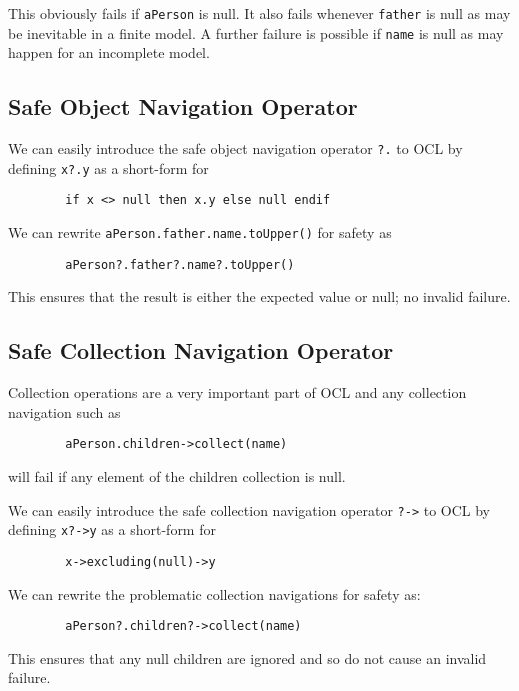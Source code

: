 \documentclass{llncs}
\begin{document}
This obviously fails if \verb|aPerson| is null. It also fails whenever \verb|father| is null as may be inevitable in a finite model. A further failure is possible if \verb|name| is null as may happen for an incomplete model.

\subsection{Safe Object Navigation Operator}

We can easily introduce the safe object  navigation operator \verb|?.|  to OCL by defining \verb|x?.y| as a short-form for 

\begin{verbatim}
        if x <> null then x.y else null endif
\end{verbatim}

We can rewrite \verb|aPerson.father.name.toUpper()| for safety as

\begin{verbatim}
        aPerson?.father?.name?.toUpper()
\end{verbatim}

This ensures that the result is either the expected value or null; no invalid failure.

\subsection{Safe Collection Navigation Operator}

Collection operations are a very important part of OCL and any collection navigation such as 
\begin{verbatim}
        aPerson.children->collect(name)
\end{verbatim}
will fail if any element of the children collection is null.

We can easily introduce the safe collection navigation operator \verb|?->|  to OCL by defining \verb|x?->y| as a short-form for 

\begin{verbatim}
        x->excluding(null)->y
\end{verbatim}

We can rewrite the problematic collection navigations for safety as:

\begin{verbatim}
        aPerson?.children?->collect(name)
\end{verbatim}

This ensures that any null children are ignored and so do not cause an invalid failure.
\end{document}
